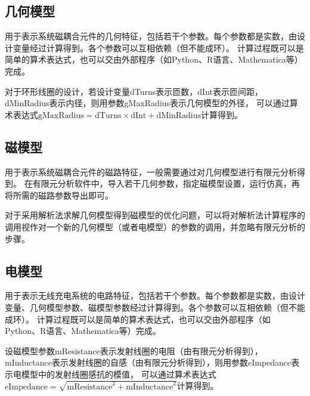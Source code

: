 \documentclass[index]{subfiles}
\begin{document}
\subsection{几何模型}
\begin{definition}[几何模型]
  用于表示系统磁耦合元件的几何特征，包括若干个参数。每个参数都是实数，由设计变量经过计算得到。各个参数可以互相依赖（但不能成环）。
  计算过程既可以是简单的算术表达式，也可以交由外部程序（如Python、R语言、Mathematica等）完成。
\end{definition}
\begin{example}[几何模型的参数]
  对于环形线圈的设计，若设计变量dTurns表示匝数，dInt表示匝间距，dMinRadius表示内径，则用参数gMaxRadius表示几何模型的外径，
  可以通过算术表达式$\textrm{gMaxRadius}=\textrm{dTurns}\times\textrm{dInt}+\textrm{dMinRadius}$计算得到。
\end{example}

\subsection{磁模型}
\begin{definition}[磁模型]
  用于表示系统磁耦合元件的磁路特征，一般需要通过对几何模型进行有限元分析得到。
  在有限元分析软件中，导入若干几何参数，指定磁模型设置，运行仿真，再将所需的磁路参数导出即可。
\end{definition}
\begin{remark}[不采用有限元分析计算磁模型]
  对于采用解析法求解几何模型得到磁模型的优化问题，可以将对解析法计算程序的调用视作对一个新的几何模型（或者电模型）的参数的调用，并忽略有限元分析的步骤。
\end{remark}

\subsection{电模型}
\begin{definition}[电模型]
  用于表示无线充电系统的电路特征，包括若干个参数。每个参数都是实数，由设计变量、几何模型参数、磁模型参数经过计算得到。各个参数可以互相依赖（但不能成环）。
  计算过程既可以是简单的算术表达式，也可以交由外部程序（如Python、R语言、Mathematica等）完成。
\end{definition}
\begin{example}[电模型的参数]
  设磁模型参数mResistance表示发射线圈的电阻（由有限元分析得到），mInductance表示发射线圈的自感（由有限元分析得到），则用参数eImpedance表示电模型中的发射线圈感抗的模值，
  可以通过算术表达式$\textrm{eImpedance}=\sqrt{\textrm{mResistance}^2+\textrm{mInductance}^2}$计算得到。
\end{example}
\end{document}
